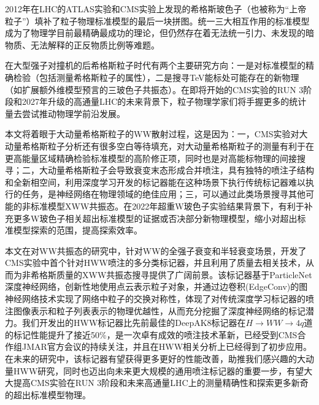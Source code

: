 \begin{cabstract}
    \kaishu
	2012年在LHC的ATLAS实验和CMS实验上发现的希格斯玻色子（也被称为“上帝粒子”）填补了粒子物理标准模型的最后一块拼图。统一三大相互作用的标准模型成为了物理学目前最精确最成功的理论，但仍然存在着无法统一引力、未发现的暗物质、无法解释的正反物质比例等难题。
	
	在大型强子对撞机的后希格斯粒子时代有两个主要研究方向：一是对标准模型的精确检验（包括测量希格斯粒子的属性），二是搜寻TeV能标处可能存在的新物理（如扩展额外维模型预言的三玻色子共振态）。在即将开始的CMS实验的RUN 3阶段和2027年升级的高通量LHC的未来背景下，粒子物理学家们将手握更多的统计量去尝试推动物理学前沿发展。
	
	本文将着眼于大动量希格斯粒子的WW散射过程，这是因为：一，CMS实验对大动量希格斯粒子分析还有很多空白等待填充，对大动量希格斯粒子的测量有利于在更高能量区域精确检验标准模型的高阶修正项，同时也是对高能标物理的间接搜寻；二，大动量希格斯粒子会导致衰变末态形成合并喷注，具有独特的喷注子结构和全新相空间，利用深度学习开发的标记器能在这种场景下执行传统标记器难以执行的任务，是神经网络在物理领域的绝佳应用；三，可以通过此类场景搜寻其他可能的非标准模型XWW共振态。在2022年超重W玻色子实验结果背景下，有利于补充更多W玻色子相关超出标准模型的证据或否决部分新物理模型，缩小对超出标准模型探索的范围，提高探索效率。
	
	本文在对WW共振态的研究中，针对WW的全强子衰变和半轻衰变场景，开发了CMS实验中首个针对HWW喷注的多分类标记器，并且利用了质量去相关技术，从而为非希格斯质量的XWW共振态搜寻提供了广阔前景。该标记器基于ParticleNet深度神经网络，创新性地使用点云表示粒子对象，并通过边卷积(EdgeConv)的图神经网络技术实现了网络中粒子的交换对称性，体现了对传统深度学习标记器的喷注图像表示和粒子列表表示的物理优越性，从而充分挖掘了深度神经网络的标记潜力。我们开发出的HWW标记器比先前最佳的DeepAK8标记器在$H\to WW\to 4q$道的标记性能提升了接近50\%，是一次卓有成效的喷注技术革新，已经受到CMS合作组JMAR官方会议的持续关注，并且在HWW相关分析上已经得到了初步应用。在未来的研究中，该标记器有望获得更多更好的性能改善，助推我们感兴趣的大动量HWW研究，同时也迈出向未来更大规模的通用喷注标记器的重要一步，有望大大提高CMS实验在RUN 3阶段和未来高通量LHC上的测量精确性和探索更多新奇的超出标准模型物理。
\end{cabstract}

